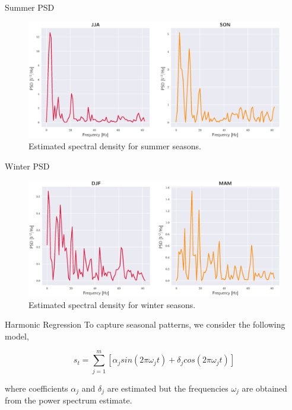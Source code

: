 \documentclass[10pt]{beamer}
\begin{document}
\begin{frame}{Summer PSD}
	\begin{figure}[htbp]
		\centering
		\includegraphics[scale=0.37]{summer_psd}
		\caption{Estimated spectral density for summer seasons.}
	\end{figure}
\end{frame}

\begin{frame}{Winter PSD}
	\begin{figure}[htbp]
		\centering
		\includegraphics[scale=0.37]{winter_psd}
		\caption{Estimated spectral density for winter seasons.}
	\end{figure}
\end{frame}

\begin{frame}{Harmonic Regression}
To capture seasonal patterns, we consider the following model,

$$
s_t = 
\sum_{j=1}^{m}[\alpha_{j}sin(2\pi\omega_{j}t)+\delta_{j}cos(2\pi\omega_{j}t)]
$$

where coefficients $\alpha_j$ and $\delta_j$ are estimated but the frequencies
$\omega_j$ are obtained from the power spectrum estimate.

\end{frame}
\end{document}
